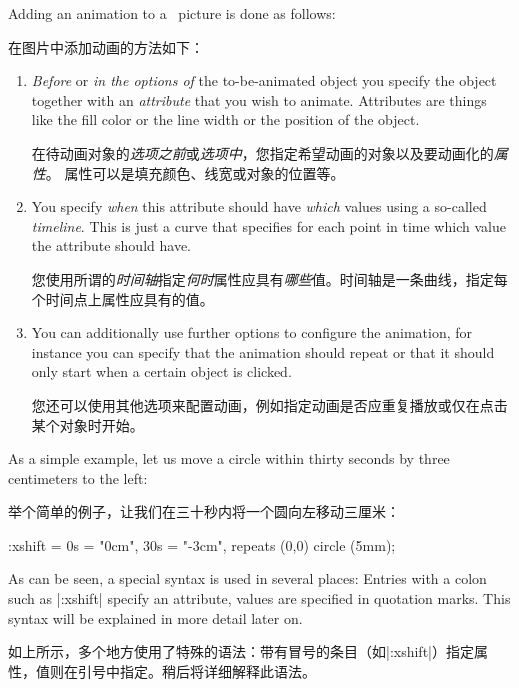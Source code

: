 Adding an animation to a \tikzname\ picture is done as follows:

在\tikzname 图片中添加动画的方法如下：


\begin{enumerate}
    \item \emph{Before} or \emph{in the options of} the to-be-animated object
        you specify the object together with an \emph{attribute} that you wish
        to animate. Attributes are things like the fill color or the line width
        or the position of the object.

        在待动画对象的\emph{选项之前}或\emph{选项中}，您指定希望动画的对象以及要动画化的\emph{属性}。
        属性可以是填充颜色、线宽或对象的位置等。


    \item You specify \emph{when} this attribute should have \emph{which}
        values using a so-called \emph{timeline}. This is just a curve that
        specifies for each point in time which value the attribute should have.

        您使用所谓的\emph{时间轴}指定\emph{何时}属性应具有\emph{哪些}值。时间轴是一条曲线，指定每个时间点上属性应具有的值。


    \item You can additionally use further options to configure the animation,
        for instance you can specify that the animation should repeat or that
        it should only start when a certain object is clicked.

        您还可以使用其他选项来配置动画，例如指定动画是否应重复播放或仅在点击某个对象时开始。


\end{enumerate}

As a simple example, let us move a circle within thirty seconds by three
centimeters to the left:

举个简单的例子，让我们在三十秒内将一个圆向左移动三厘米：


\begin{codeexample}[width=2cm,preamble={\usetikzlibrary{animations}}]
\tikz \draw :xshift = {0s = "0cm", 30s = "-3cm", repeats} (0,0) circle (5mm);
\end{codeexample}

As can be seen, a special syntax is used in several places: Entries with a
colon such as |:xshift| specify an attribute, values are specified in quotation
marks. This syntax will be explained in more detail later on.

如上所示，多个地方使用了特殊的语法：带有冒号的条目（如|:xshift|）指定属性，值则在引号中指定。稍后将详细解释此语法。


